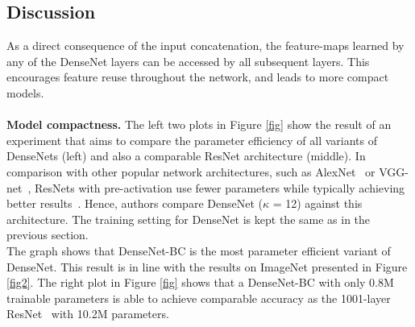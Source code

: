\documentclass[10pt,letterpaper]{article}
\begin{document}
\begin{multicols}{2}
\section{Discussion}
As a direct consequence of the input concatenation, the feature-maps learned by any of the DenseNet layers can be accessed by all subsequent layers. This encourages feature reuse throughout the network, and leads to more compact models.\\
\\
{\bf Model compactness.} The left two plots in Figure \ref{fig} show the result of an experiment that aims to compare the parameter efficiency of all variants of DenseNets (left) and also a comparable ResNet architecture (middle). In comparison with other popular network architectures, such as AlexNet~\cite{Imagenet} or VGG-net~\cite{Pedestrian}, ResNets with pre-activation use fewer parameters while typically achieving better results~\cite{Identity}. Hence, authors compare DenseNet ($\kappa$ = 12) against this architecture. The training setting for DenseNet is kept the same as in the previous section.\\
\indent The graph shows that DenseNet-BC is the most parameter efficient variant of DenseNet. This result is in line with the results on ImageNet presented in Figure \ref{fig2}. The right plot in Figure \ref{fig} shows that a DenseNet-BC with only 0.8M trainable parameters is able to achieve comparable accuracy as the 1001-layer ResNet~\cite{Identity} with 10.2M parameters.
{\small

	
}
\end{multicols}
\end{document}

